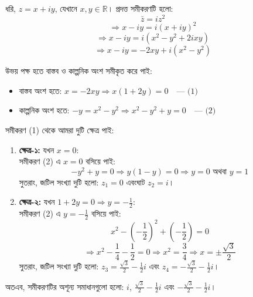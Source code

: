 \documentclass[12pt, a4paper]{article}
\begin{document}
\begin{tcolorbox}[solutionbox={সমাধান (Solution)}]
    \noindent
    ধরি, $z = x + iy$, যেখানে $x, y \in \mathbb{R}$। প্রদত্ত সমীকরণটি হলো:
    \[ \bar{z} = i z^2 \]
    \[ \Rightarrow x - iy = i(x + iy)^2 \]
    \[ \Rightarrow x - iy = i(x^2 - y^2 + 2ixy) \]
    \[ \Rightarrow x - iy = -2xy + i(x^2 - y^2) \]
    
    \vspace{0.5em}
    উভয় পক্ষ হতে বাস্তব ও কাল্পনিক অংশ সমীকৃত করে পাই:
    \begin{itemize}[itemsep=0.3em]
        \item বাস্তব অংশ হতে: $x = -2xy \Rightarrow x(1 + 2y) = 0 \quad \text{--- (1)}$
        \item কাল্পনিক অংশ হতে: $-y = x^2 - y^2 \Rightarrow x^2 - y^2 + y = 0 \quad \text{--- (2)}$
    \end{itemize}
    
    \vspace{0.5em}
    সমীকরণ (1) থেকে আমরা দুটি ক্ষেত্র পাই:
    \begin{enumerate}[itemsep=0.4em]
        \item \textbf{ক্ষেত্র-১:} যখন $x = 0$: \\
        সমীকরণ (2) এ $x = 0$ বসিয়ে পাই:
        \[ -y^2 + y = 0 \Rightarrow y(1 - y) = 0 \Rightarrow y = 0 \text{ অথবা } y = 1 \]
        সুতরাং, জটিল সংখ্যা দুটি হলো: $z_1 = 0$ এবংঘাট $z_2 = i$।
        
        \item \textbf{ক্ষেত্র-২:} যখন $1 + 2y = 0 \Rightarrow y = -\frac{1}{2}$: \\
        সমীকরণ (2) এ $y = -\frac{1}{2}$ বসিয়ে পাই:
        \[ x^2 - \left(-\frac{1}{2}\right)^2 + \left(-\frac{1}{2}\right) = 0 \]
        \[ \Rightarrow x^2 - \frac{1}{4} - \frac{1}{2} = 0 \Rightarrow x^2 = \frac{3}{4} \Rightarrow x = \pm \frac{\sqrt{3}}{2} \]
        সুতরাং, জটিল সংখ্যা দুটি হলো: $z_3 = \frac{\sqrt{3}}{2} - \frac{1}{2}i$ এবং $z_4 = -\frac{\sqrt{3}}{2} - \frac{1}{2}i$।
    \end{enumerate}
    
    \vspace{0.5em}
    অতএব, সমীকরণটির অশূন্য সমাধানগুলো হলো: $i$, $\frac{\sqrt{3}}{2} - \frac{1}{2}i$ এবং $-\frac{\sqrt{3}}{2} - \frac{1}{2}i$।
\end{tcolorbox}
\end{document}
